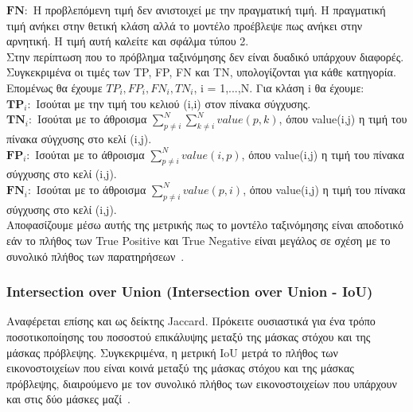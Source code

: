 \documentclass[12pt]{article}
\numberwithin{equation}{section}
\begin{document}
\noindent$\mathbf{FΝ: }$ Η προβλεπόμενη τιμή δεν ανιστοιχεί με την πραγματική τιμή. Η πραγματική τιμή ανήκει στην θετική κλάση αλλά το μοντέλο προέβλεψε πως ανήκει στην αρνητική. Η τιμή αυτή καλείτε και σφάλμα τύπου 2. \\

\noindent Στην περίπτωση που το πρόβλημα ταξινόμησης δεν είναι δυαδικό υπάρχουν διαφορές.  Συγκεκριμένα οι τιμές των TP, FP, FN και TN, υπολογίζονται για κάθε κατηγορία. Επομένως θα έχουμε \(TP_i, FP_i, FN_i, TN_i\), i = 1,...,N. Για κλάση i θα έχουμε: \\

\noindent $\mathbf{TP}_i:$ Ισούται με την τιμή του κελιού (i,i) στον πίνακα σύγχυσης. \\

\noindent $\mathbf{TN}_i:$ Ισούται με το άθροισμα $\sum_{p \neq i}^{N} \sum_{k \neq i}^{N} value(p,k)$, όπου value(i,j) η τιμή του πίνακα σύγχυσης στο κελί (i,j). \\

\noindent $\mathbf{FP}_i:$ Ισούται με το άθροισμα $\sum_{p \neq i}^{N} value(i,p)$, όπου value(i,j) η τιμή του πίνακα σύγχυσης στο κελί (i,j).\\

\noindent $\mathbf{FN}_i:$ Ισούται με το άθροισμα $\sum_{p \neq i}^{N} value(p,i)$, όπου value(i,j) η τιμή του πίνακα σύγχυσης στο κελί (i,j). \\




\noindent Αποφασίζουμε μέσω αυτής της μετρικής πως το μοντέλο ταξινόμησης είναι αποδοτικό εάν το πλήθος των True Positive και True Negative είναι μεγάλος σε σχέση με το συνολικό πλήθος των παρατηρήσεων~\cite{bhandari2025confusion}. 


\subsubsection{Intersection over Union (Intersection over Union - IoU)}

Αναφέρεται επίσης και ως δείκτης Jaccard. Πρόκειτε ουσιαστικά για ένα τρόπο ποσοτικοποίησης του ποσοστού επικάλυψης μεταξύ της μάσκας στόχου και της μάσκας πρόβλεψης. Συγκεκριμένα, η μετρική IoU μετρά το πλήθος των εικονοστοιχείων που είναι κοινά μεταξύ της μάσκας στόχου και της μάσκας πρόβλεψης, διαιρούμενο με τον συνολικό πλήθος των εικονοστοιχείων που υπάρχουν και στις δύο μάσκες μαζί~\cite{elharrouss2021panopticsegmentationreview}. \\
\end{document}
